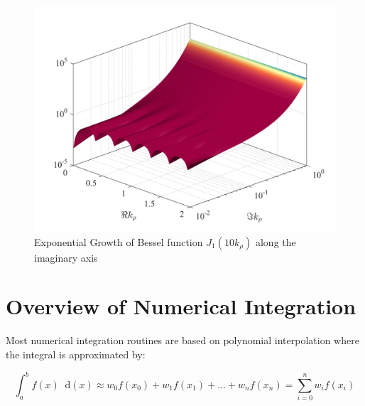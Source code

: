 \documentclass[11pt]{article}
\newcommand{\p}{\rho}  %
\renewcommand{\^}{\hat}  %
\newcommand*\diff{\mathop{}\!\mathrm{d}} %
\begin{document}
\begin{figure}[h!]
  \centering
  \includegraphics[width=\textwidth]{figures/J_1_comp.png}
  \caption{Exponential Growth of Bessel function $J_1(10 k_{\p})$ along the imaginary axis}
  \label{fig:bessel}
\end{figure}

\section{Overview of Numerical Integration}

Most numerical integration routines are based on polynomial interpolation where the integral is approximated by:

\begin{equation}
  \int_a^b f(x) \diff(x) \approx w_0 f(x_0) + w_1 f(x_1) + ... + w_n f(x_n) = \sum_{i = 0}^n w_i f(x_i) 
  \label{eq:Num_int}
\end{equation}
  \clearpage %
  
  
\end{document}
